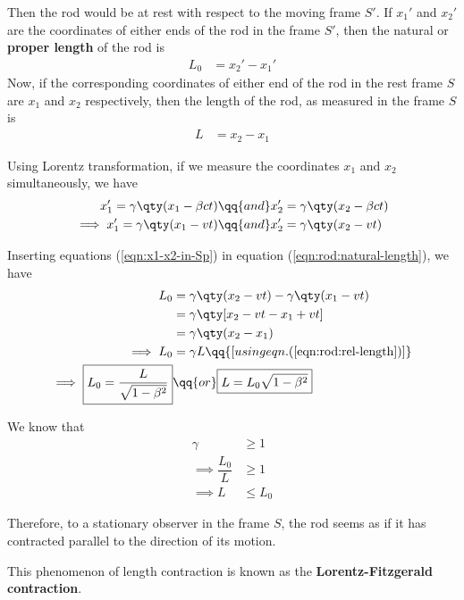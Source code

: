 		Then the rod would be at rest with respect to the moving frame $S'$. If $x_1'$ and $x_2'$ are the coordinates of either ends of the rod in the frame $S'$, then the natural or \textbf{proper length} of the rod is
		\begin{align}
			L_0&=x_2'-x_1' \label{eqn:rod:natural-length}
		\end{align}
		Now, if the corresponding coordinates of either end of the rod in the rest frame $S$ are $x_1$ and $x_2$ respectively, then the length of the rod, as measured in the frame $S$ is
		\begin{align}
			L&=x_2-x_1 \label{eqn:rod:rel-length}
		\end{align}
		
		Using Lorentz transformation, if we measure the coordinates $x_1$ and $x_2$ simultaneously, we have
		\begin{align}
			x_1'=\gamma\qty(x_1-\beta ct)&\qq{and}x_2'=\gamma\qty(x_2-\beta ct) \nonumber\\
			\implies x_1'=\gamma\qty(x_1-vt)&\qq{and}x_2'=\gamma\qty(x_2-vt) \label{eqn:x1-x2-in-Sp}
		\end{align}
		
		Inserting equations (\ref{eqn:x1-x2-in-Sp}) in equation (\ref{eqn:rod:natural-length}), we have
		\begin{align}
			L_0&=\gamma\qty(x_2-vt)-\gamma\qty(x_1-vt) \nonumber\\
				&=\gamma\qty[x_2-vt-x_1+vt] \nonumber\\
				&=\gamma\qty(x_2-x_1) \nonumber\\
			\implies L_0&=\gamma L\qq{[using eqn. (\ref{eqn:rod:rel-length})]} \nonumber\\
			\implies \boxed{L_0=\dfrac{L}{\sqrt{1-\beta^2}}}&\qq{or}\boxed{L=L_0\sqrt{1-\beta^2}} \label{eqn:length-contraction}
		\end{align}
		
		We know that
		\begin{align*}
			\gamma&\geqslant 1 \\
			\implies\dfrac{L_0}{L}&\geqslant 1 \\
			\implies L&\leqslant L_0
		\end{align*}
		
		Therefore, to a stationary observer in the frame $S$, the rod seems as if it has contracted parallel to the direction of its motion.
		
		This phenomenon of length contraction is known as the \textbf{Lorentz-Fitzgerald contraction}.
		
